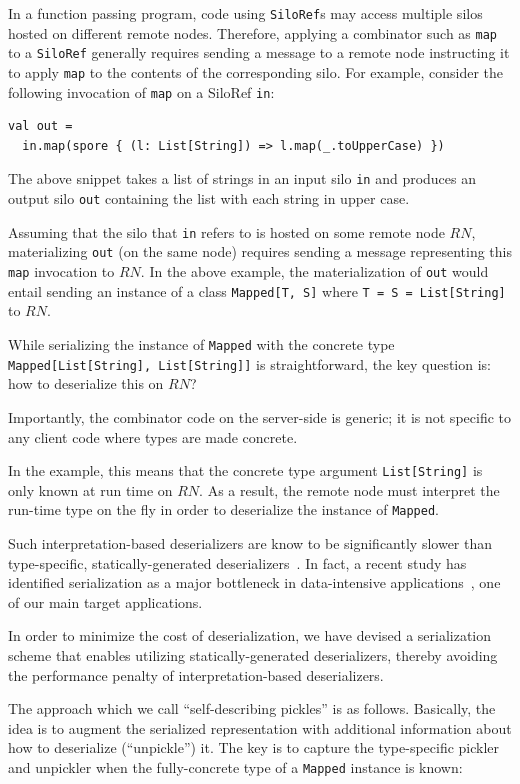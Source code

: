 \documentclass[10pt]{sigplanconf}
\theoremstyle{definition}
\theoremstyle{definition}
\begin{document}
In a function passing program, code using \verb|SiloRef|s may access multiple
silos hosted on different remote nodes. Therefore, applying a combinator such as
\verb|map| to a \verb|SiloRef| generally requires sending a message to a remote
node instructing it to apply \verb|map| to the contents of the corresponding
silo. For example, consider the following invocation of \verb|map| on a SiloRef
\verb|in|:

\begin{lstlisting}
val out =
  in.map(spore { (l: List[String]) => l.map(_.toUpperCase) })
\end{lstlisting}

The above snippet takes a list of strings in an input silo \verb|in| and
produces an output silo \verb|out| containing the list with each string in upper
case.

Assuming that the silo that \verb|in| refers to is hosted on some remote node
$RN$, materializing \verb|out| (on the same node) requires sending a message
representing this \verb|map| invocation to $RN$. In the above example, the
materialization of \verb|out| would entail sending an instance of a class
\verb|Mapped[T, S]| where \verb|T = S = List[String]| to $RN$.

While serializing the instance of \verb|Mapped| with the concrete type
\verb|Mapped[List[String], List[String]]| is straightforward, the key question
is: how to deserialize this on $RN$?

Importantly, the combinator code on the server-side is generic; it is not
specific to any client code where types are made concrete.

In the example, this means that the concrete type argument \verb|List[String]|
is only known at run time on $RN$. As a result, the remote node must interpret
the run-time type on the fly in order to deserialize the instance of
\verb|Mapped|.

Such interpretation-based deserializers are know to be significantly slower than
type-specific, statically-generated deserializers~\cite{Pickling}. In fact, a
recent study has identified serialization as a major bottleneck in
data-intensive applications~\cite{Ousterhout}, one of our main target
applications.

In order to minimize the cost of deserialization, we have devised a
serialization scheme that enables utilizing statically-generated deserializers,
thereby avoiding the performance penalty of interpretation-based deserializers.

The approach which we call ``self-describing pickles'' is as follows. Basically,
the idea is to augment the serialized representation with additional information
about how to deserialize (``unpickle'') it. The key is to capture the
type-specific pickler and unpickler when the fully-concrete type of a
\verb|Mapped| instance is known:
\end{document}
